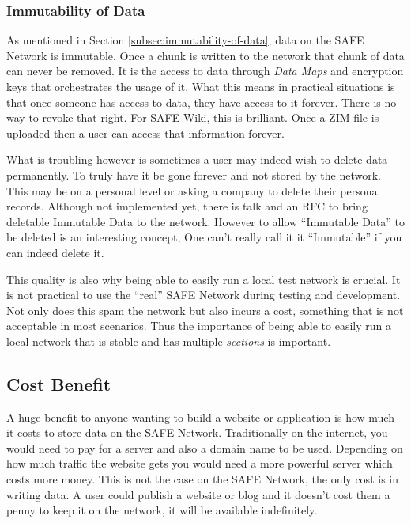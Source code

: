 \subsubsection{Immutability of Data}

As mentioned in Section \ref{subsec:immutability-of-data}, data on the SAFE Network is immutable. Once a chunk is written to the network that chunk of data can never be removed. It is the access to data through \textit{Data Maps} and encryption keys that orchestrates the usage of it. What this means in practical situations is that once someone has access to data, they have access to it forever. There is no way to revoke that right. For SAFE Wiki, this is brilliant. Once a ZIM file is uploaded then a user can access that information forever.

What is troubling however is sometimes a user may indeed wish to delete data permanently. To truly have it be gone forever and not stored by the network. This may be on a personal level or asking a company to delete their personal records. Although not implemented yet, there is talk and an RFC\cite{delete-data-rfc} to bring deletable Immutable Data to the network. However to allow ``Immutable Data'' to be deleted is an interesting concept, One can't really call it it ``Immutable'' if you can indeed delete it.

This quality is also why being able to easily run a local test network is crucial. It is not practical to use the ``real'' SAFE Network during testing and development. Not only does this spam the network but also incurs a cost, something that is not acceptable in most scenarios. Thus the importance of being able to easily run a local network that is stable and has multiple \textit{sections} is important.

\subsection{Cost Benefit}
 
A huge benefit to anyone wanting to build a website or application is how much it costs to store data on the SAFE Network. Traditionally on the internet, you would need to pay for a server and also a domain name to be used. Depending on how much traffic the website gets you would need a more powerful server which costs more money. This is not the case on the SAFE Network, the only cost is in writing data. A user could publish a website or blog and it doesn't cost them a penny to keep it on the network, it will be available indefinitely.
 
